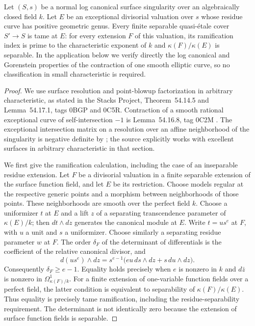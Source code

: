 \begin{proposition}
\label{D:lc-elliptic-tame}
Let $(S,s)$ be a normal log canonical surface singularity over an
algebraically closed field $k$.  Let $E$ be an exceptional divisorial
valuation over $s$ whose residue curve has positive geometric genus.
Every finite separable quasi-\'etale cover $S'\to S$ is tame at $E$:
for every extension $F$ of this valuation, its ramification index is
prime to the characteristic exponent of $k$ and
$\kappa(F)/\kappa(E)$ is separable.
In the application below we verify directly the log canonical and
Gorenstein properties of the contraction of one smooth elliptic curve,
so no classification in small characteristic is required.
\end{proposition}
\begin{proof}
We use surface resolution and point-blowup factorization in arbitrary
characteristic, as stated in the Stacks Project,
Theorem~54.14.5 and Lemma~54.17.1, tags 0BGP and 0C5R.
Contraction of a smooth rational exceptional curve of self-intersection
$-1$ is Lemma~54.16.8, tag 0C2M
\cite{StacksDSurfaceResolution}.
The exceptional intersection matrix on a resolution over an affine
neighborhood of the singularity is negative definite by
\cite[section 10.1, Theorem 10.1]{Kollar2013D}; the source explicitly
works with excellent surfaces in arbitrary characteristic in that
section.

We first give the ramification calculation, including the case of an
inseparable residue extension.  Let $F$ be a divisorial valuation in
a finite separable extension of the surface function field, and let
$E$ be its restriction.  Choose models regular at the respective
generic points and a morphism between neighborhoods of those points.
These neighborhoods are smooth over the perfect field $k$.
Choose a uniformizer $t$ at $E$ and a lift $z$ of a separating
transcendence parameter of $\kappa(E)/k$; then $dt\wedge dz$
generates the canonical module at $E$.  Write
$t=u s^e$ at $F$, with $u$ a unit and $s$ a uniformizer.
Choose similarly a separating residue parameter $w$ at $F$.
The order $\delta_F$ of the determinant of differentials is the
coefficient of the relative canonical divisor, and
\[
 d(u s^e)\wedge dz
   =s^{e-1}\bigl(eu\,ds\wedge dz+s\,du\wedge dz\bigr).
\]
Consequently $\delta_F\geq e-1$.  Equality holds precisely when
$e$ is nonzero in $k$ and $d\bar z$ is nonzero in
$\Omega^1_{\kappa(F)/k}$.  For a finite extension of one-variable
function fields over a perfect field, the latter condition is
equivalent to separability of $\kappa(F)/\kappa(E)$.
Thus equality is precisely tame ramification, including the
residue-separability requirement.  The determinant is not identically
zero because the extension of surface function fields is separable.


\end{proof}
